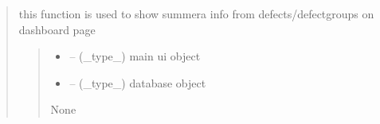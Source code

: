 \documentclass[letterpaper,10pt,english]{sphinxmanual}
\begin{document}
\begin{quote}
\begin{savenotes}
\begin{fulllineitems}
\begin{quote}
\begin{description}
\end{description}\end{quote}

\end{fulllineitems}\end{savenotes}


\begin{savenotes}\begin{fulllineitems}
\label{\detokenize{setting/backend/defect_management_funcs:oxin.backend.defect_management_funcs.show_defects_summary_info}}
\pysigstartsignatures
{}
\pysigstopsignatures
\sphinxAtStartPar
this function is used to show summera info from defects/defect\sphinxhyphen{}groups on dashboard page
\begin{quote}\begin{description}
\begin{itemize}
\item {} 
\sphinxAtStartPar
{} – (\_type\_) main ui object

\item {} 
\sphinxAtStartPar
{} – (\_type\_) database object

\end{itemize}

\sphinxAtStartPar
None

\end{description}\end{quote}

\end{fulllineitems}\end{savenotes}



\end{quote}
\end{document}
